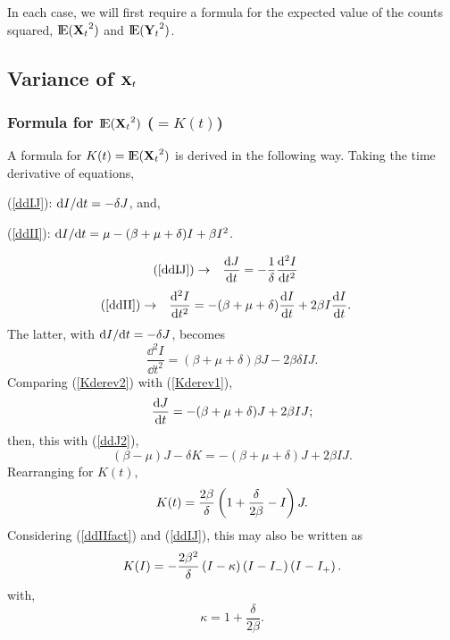 In each case, we will first require a formula for the expected value of the counts squared,  ${\rm I}\!{\rm E}({{\bf X}_t}^2)$ and ${\rm I}\!{\rm E}({{\bf Y}_t}^2)$.






\subsection{Variance of ${{\bf X}_t}$}

\subsubsection{Formula for ${\rm I}\!{\rm E}({{\bf X}_t}^2)$ ($ = K(t)$)}

A formula for $K(t) = {\rm I}\!{\rm E}({{\bf X}_t}^2)$ is derived in the following way. Taking the time derivative of equations,

 (\ref{ddIJ}): ${\rm d}I/{\rm d}t = -\delta J$, and, 
 
 (\ref{ddII}): ${\rm d}I/{\rm d}t = \mu - (\beta + \mu + \delta) I + \beta I^2$.

\begin{align}
\label{Kderev1}
\text{(\ref{ddIJ})}\to&&\displaystyle\frac{{\rm d} J}{{\rm d} t} = -\frac{1}{\delta}\frac{{\rm d}^2 I}{{\rm d} t^2}&&
\end{align}
\begin{align*}
\text{(\ref{ddII})}\to&& \frac{{\rm d}^2 I}{{\rm d} t^2} = -(\beta + \mu + \delta) \displaystyle\frac{{\rm d} I}{{\rm d} t} + 2\beta I \displaystyle\frac{{\rm d} I}{{\rm d} t}.&&
\end{align*}
The latter, with ${\rm d}I/{\rm d}t = -\delta J$, becomes
\begin{equation}
\label{Kderev2}
\frac{\dd^2 I}{\dd t^2} = (\beta + \mu + \delta)\beta J- 2\beta \delta I J.
\end{equation}
Comparing (\ref{Kderev2}) with (\ref{Kderev1}),
\begin{equation*}
\displaystyle\frac{{\rm d} J}{{\rm d} t} = -(\beta + \mu + \delta) J + 2\beta I J;
\end{equation*}
then, this with (\ref{ddJ2}),
$$(\beta - \mu) J - \delta K = -(\beta + \mu + \delta) J + 2\beta I J.$$
Rearranging for $K(t)$,
\begin{equation}
\label{Kt1}
K(t) = \frac{2\beta}{\delta}\left(1+\frac{\delta}{2\beta} - I\right) J.
\end{equation}
Considering (\ref{ddIIfact}) and (\ref{ddIJ}), this may also be written as
\begin{equation}
\label{KtI}
K(I) = -\frac{2\beta^2}{\delta}\left( I-\kappa\right)\left( I-I_-\right)\left( I-I_+\right).
\end{equation}
with,
$$\kappa = 1+\frac{\delta}{2\beta}.$$



